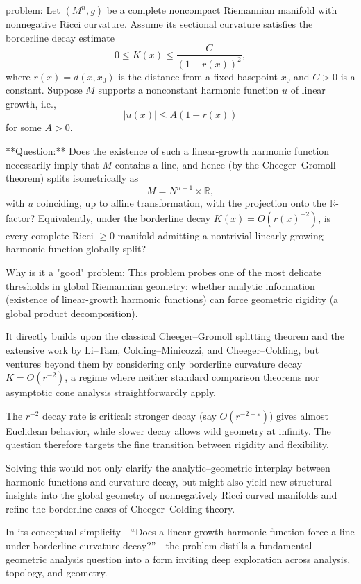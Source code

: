 problem:  
Let \( (M^n, g) \) be a complete noncompact Riemannian manifold with nonnegative Ricci curvature. Assume its sectional curvature satisfies the borderline decay estimate  
\[
0 \le K(x) \le \frac{C}{(1+r(x))^2},
\]
where \(r(x) = d(x, x_0)\) is the distance from a fixed basepoint \(x_0\) and \(C > 0\) is a constant.  
Suppose \(M\) supports a nonconstant harmonic function \(u\) of linear growth, i.e.,  
\[
|u(x)| \le A(1 + r(x))
\]
for some \(A > 0\).

**Question:**  
Does the existence of such a linear-growth harmonic function necessarily imply that \(M\) contains a line, and hence (by the Cheeger–Gromoll theorem) splits isometrically as
\[
M = N^{n-1} \times \mathbb{R},
\]
with \(u\) coinciding, up to affine transformation, with the projection onto the \(\mathbb{R}\)-factor?  
Equivalently, under the borderline decay \(K(x) = O(r(x)^{-2})\), is every complete Ricci \(\ge 0\) manifold admitting a nontrivial linearly growing harmonic function globally split?

Why is it a "good" problem:  
This problem probes one of the most delicate thresholds in global Riemannian geometry: whether analytic information (existence of linear-growth harmonic functions) can force geometric rigidity (a global product decomposition).  

It directly builds upon the classical Cheeger–Gromoll splitting theorem and the extensive work by Li–Tam, Colding–Minicozzi, and Cheeger–Colding, but ventures beyond them by considering only borderline curvature decay \(K = O(r^{-2})\), a regime where neither standard comparison theorems nor asymptotic cone analysis straightforwardly apply.  

The \(r^{-2}\) decay rate is critical: stronger decay (say \(O(r^{-2-\varepsilon})\)) gives almost Euclidean behavior, while slower decay allows wild geometry at infinity. The question therefore targets the fine transition between rigidity and flexibility.  

Solving this would not only clarify the analytic–geometric interplay between harmonic functions and curvature decay, but might also yield new structural insights into the global geometry of nonnegatively Ricci curved manifolds and refine the borderline cases of Cheeger–Colding theory.  

In its conceptual simplicity—“Does a linear-growth harmonic function force a line under borderline curvature decay?”—the problem distills a fundamental geometric analysis question into a form inviting deep exploration across analysis, topology, and geometry.